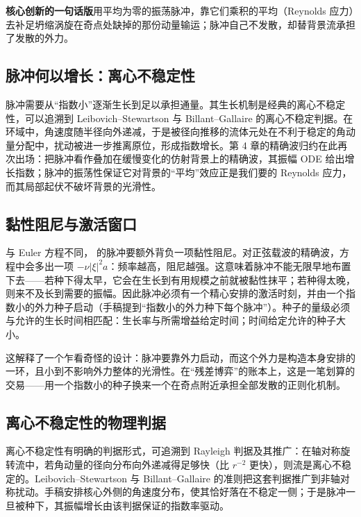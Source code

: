 \begin{keybox}
\textbf{核心创新的一句话版}\quad 用平均为零的振荡脉冲，靠它们乘积的平均（Reynolds 应力）去补足坍缩涡旋在奇点处缺掉的那份动量输运；脉冲自己不发散，却替背景流承担了发散的外力。
\end{keybox}

\subsection{脉冲何以增长：离心不稳定性}

脉冲需要从“指数小”逐渐生长到足以承担通量。其生长机制是经典的离心不稳定性，可以追溯到 Leibovich--Stewartson 与 Billant--Gallaire 的离心不稳定判据\cite{leibovich,billant}。在环域中，角速度随半径向外递减，于是被径向推移的流体元处在不利于稳定的角动量分配中，扰动被进一步推离原位，形成指数增长。第 4 章的精确波归约在此再次出场：把脉冲看作叠加在缓慢变化的仿射背景上的精确波，其振幅 ODE 给出增长指数；脉冲的振荡性保证它对背景的“平均”效应正是我们要的 Reynolds 应力，而其局部起伏不破坏背景的光滑性。

\subsection{黏性阻尼与激活窗口}

与 Euler 方程不同，\NS{} 的脉冲要额外背负一项黏性阻尼。对正弦载波的精确波，方程中会多出一项 $-\nu|\xi|^{2}a$：频率越高，阻尼越强。这意味着脉冲不能无限早地布置下去——若种下得太早，它会在生长到有用规模之前就被黏性抹平；若种得太晚，则来不及长到需要的振幅。因此脉冲必须有一个精心安排的激活时刻，并由一个指数小的外力种子启动（手稿提到“指数小的外力种下每个脉冲”）。种子的量级必须与允许的生长时间相匹配：生长率与所需增益给定时间；时间给定允许的种子大小。

这解释了一个乍看奇怪的设计：脉冲要靠外力启动，而这个外力是构造本身安排的一环，且小到不影响外力整体的光滑性。在“残差博弈”的账本上，这是一笔划算的交易——用一个指数小的种子换来一个在奇点附近承担全部发散的正则化机制。

\subsection{离心不稳定性的物理判据}

离心不稳定性有明确的判据形式，可追溯到 Rayleigh 判据及其推广：在轴对称旋转流中，若角动量的径向分布向外递减得足够快（比 $r^{-2}$ 更快），则流是离心不稳定的。Leibovich--Stewartson 与 Billant--Gallaire 的准则把这套判据推广到非轴对称扰动。手稿安排核心外侧的角速度分布，使其恰好落在不稳定一侧；于是脉冲一旦被种下，其振幅增长由该判据保证的指数率驱动。

